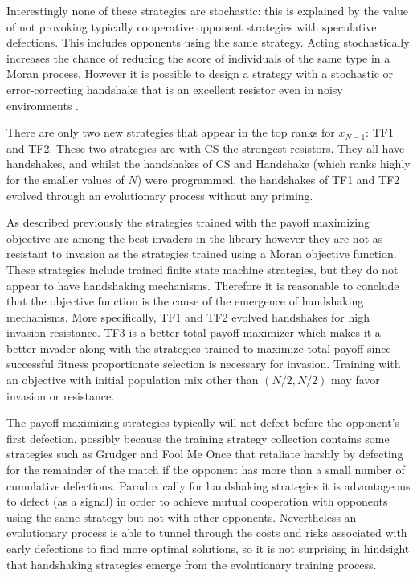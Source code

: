 \documentclass[10pt,letterpaper]{article}
\begin{document}
Interestingly none of these strategies are stochastic: this is explained by the
value of not provoking typically cooperative opponent strategies with
speculative defections. This includes opponents using the same strategy.  Acting
stochastically increases the chance of reducing the score of individuals of the
same type in a Moran process.  However it is possible to design a strategy with
a stochastic or error-correcting handshake that is an excellent resistor even in
noisy environments \cite{Lee2015}.

There are only two new strategies that appear in the top ranks for
\(x_{N-1}\): TF1 and TF2. These two strategies are with CS the strongest
resistors. They all have handshakes, and whilst the handshakes of CS and
Handshake (which ranks highly for the smaller values of \(N\)) were
programmed, the handshakes of TF1 and TF2 evolved through an evolutionary
process without any priming.

As described previously the strategies trained with
the payoff maximizing objective are among the best invaders in the library
however they are not as resistant to invasion as the strategies trained using a
Moran objective function. These strategies include trained finite state machine
strategies, but they do not appear to have handshaking mechanisms. Therefore it
is reasonable to conclude that the objective function is the cause of the
emergence of handshaking mechanisms. More specifically, TF1 and TF2 evolved
handshakes for high invasion resistance. TF3 is a better total payoff maximizer
which makes it a better invader along with the strategies
trained to maximize total payoff since successful fitness proportionate selection
is necessary for invasion. Training with an objective with initial population
mix other than $(N/2, N/2)$ may favor invasion or resistance.

The payoff maximizing strategies typically will not defect before the opponent's
first defection, possibly because the training strategy collection contains some
strategies such as Grudger and Fool Me Once that retaliate harshly by defecting
for the remainder of the match if the opponent has more than a small number of
cumulative defections. Paradoxically for handshaking strategies
it is advantageous to defect (as a signal)
in order to achieve mutual cooperation with opponents using the same strategy
but not with other opponents. Nevertheless an evolutionary process is able to
tunnel through the costs and risks associated with early defections to find more
optimal solutions, so it is not surprising in hindsight that handshaking
strategies emerge from the evolutionary training process.
\end{document}
